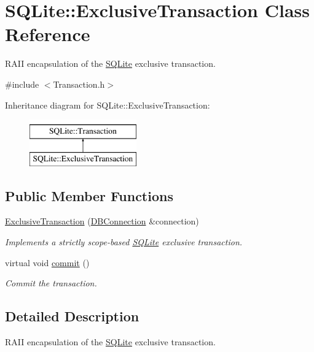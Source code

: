 \hypertarget{a00007}{\section{S\-Q\-Lite\-:\-:Exclusive\-Transaction Class Reference}
\label{a00007}
}


R\-A\-I\-I encapsulation of the \hyperlink{a00038}{S\-Q\-Lite} exclusive transaction.  




{\ttfamily \#include $<$Transaction.\-h$>$}

Inheritance diagram for S\-Q\-Lite\-:\-:Exclusive\-Transaction\-:\begin{figure}[H]
\begin{center}
\leavevmode
\includegraphics[height=2.000000cm]{a00007}
\end{center}
\end{figure}
\subsection*{Public Member Functions}
\begin{DoxyCompactItemize}
\item 
\hyperlink{a00007_a70f16f1e9764fd35b0c7e9fbf7314a1f}{Exclusive\-Transaction} (\hyperlink{a00004}{D\-B\-Connection} \&connection)
\begin{DoxyCompactList}\small\item\em Implements a strictly scope-\/based \hyperlink{a00038}{S\-Q\-Lite} exclusive transaction. \end{DoxyCompactList}\item 
\hypertarget{a00014_a9b251d84198cdc2c0208ad566fec0287}{virtual void \hyperlink{a00014_a9b251d84198cdc2c0208ad566fec0287}{commit} ()}\label{a00014_a9b251d84198cdc2c0208ad566fec0287}

\begin{DoxyCompactList}\small\item\em Commit the transaction. \end{DoxyCompactList}\end{DoxyCompactItemize}


\subsection{Detailed Description}
R\-A\-I\-I encapsulation of the \hyperlink{a00038}{S\-Q\-Lite} exclusive transaction. 

